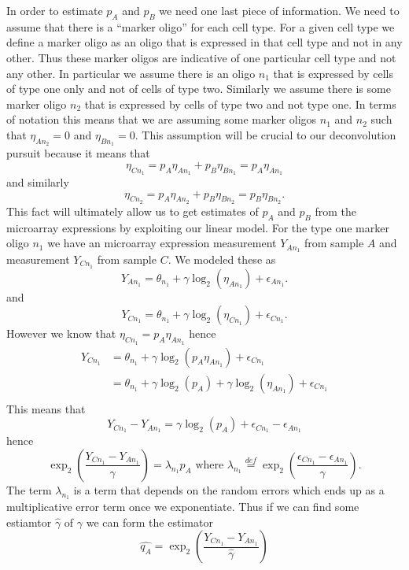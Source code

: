\documentclass[reqno,12pt,oneside]{report}\usepackage[]{graphicx}\usepackage[]{color}
\theoremstyle{plain}
\theoremstyle{definition}
\theoremstyle{remark}
\numberwithin{theorem}{chapter}     %
\begin{document}
In order to estimate $p_A$ and $p_B$ we need one last piece of information. We need to assume that there is a ``marker oligo'' for each cell type. For a given cell type we define a marker oligo as an oligo that is expressed in that cell type and not in any other. Thus these marker oligos are indicative of one particular cell type and not any other. In particular we assume there is an oligo $n_1$ that is expressed by cells of type one only and not of cells of type two. Similarly we assume there is some marker oligo $n_2$ that is expressed by cells of type two and not type one. In terms of notation this means that we are assuming some marker oligos $n_1$ and $n_2$ such that $\eta_{An_2}=0$ and $\eta_{Bn_1}=0$. This assumption will be crucial to our deconvolution pursuit because it means that 
\[
\eta_{Cn_1} = p_A\eta_{An_1} + p_B\eta_{Bn_1} = p_A\eta_{An_1} 
\]
and similarly 
\[
\eta_{Cn_2} = p_A\eta_{An_2} + p_B\eta_{Bn_2} = p_B\eta_{Bn_2}. 
\]
This fact will ultimately allow us to get estimates of $p_A$ and $p_B$ from the microarray expressions by exploiting our linear model. For the type one marker oligo $n_1$ we have an microarray expression measurement $Y_{An_1}$ from sample $A$ and measurement $Y_{Cn_1}$ from sample $C$. We modeled these as 
\[
Y_{An_1} = \theta_{n_1} + \gamma\log_2\left(\eta_{An_1}\right) + \epsilon_{An_1}.
\]
and
\[
Y_{Cn_1} = \theta_{n_1} + \gamma\log_2\left(\eta_{Cn_1}\right) + \epsilon_{Cn_1}.
\]
However we know that $\eta_{Cn_1} = p_A\eta_{An_1}$ hence 
\[
\begin{aligned}
Y_{Cn_1} &= \theta_{n_1} + \gamma\log_2\left(p_A\eta_{An_1}\right) + \epsilon_{Cn_1}\\
&= \theta_{n_1} + \gamma\log_2\left(p_A\right)+\gamma\log_2\left(\eta_{An_1}\right) + \epsilon_{Cn_1}\\
\end{aligned}
\]
This means that 
\[
Y_{Cn_1}-Y_{An_1} = \gamma\log_2\left(p_A\right) + \epsilon_{Cn_1} - \epsilon_{An_1}
\]
hence
\[
\exp_2\left(\frac{Y_{Cn_1}-Y_{An_1}}{\gamma}\right) = \lambda_{n_1} p_A \text{ where } \lambda_{n_1}\overset{def}{=}\exp_2\left(\frac{\epsilon_{Cn_1} - \epsilon_{An_1}}{\gamma}\right).
\]
The term $\lambda_{n_1}$ is a term that depends on the random errors which ends up as a multiplicative error term once we exponentiate. Thus if we can find some estiamtor $\widehat{\gamma}$ of $\gamma$ we can form the estimator
\[
\widehat{q_A} = \exp_2\left(\frac{Y_{Cn_1}-Y_{An_1}}{\widehat{\gamma}}\right)
\]
\end{document}
